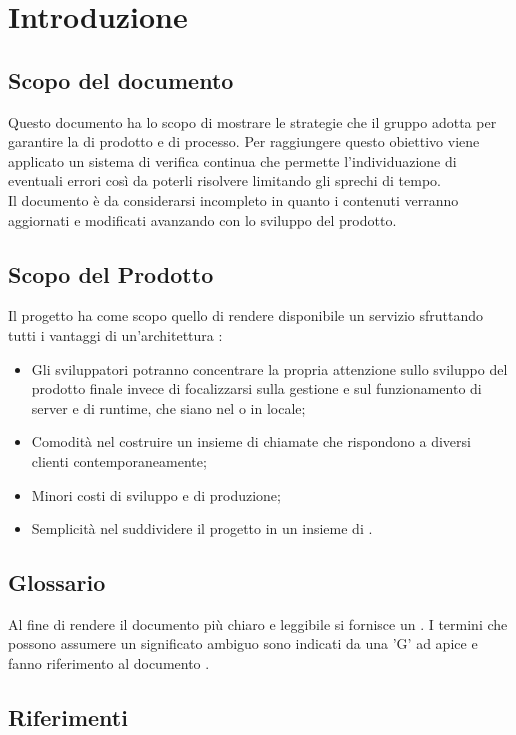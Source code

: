 \section{Introduzione}
\label{introduzione}
\subsection{Scopo del documento}
Questo documento ha lo scopo di mostrare le strategie che il gruppo {\Gruppo} adotta per garantire la  di prodotto e di processo. Per raggiungere questo obiettivo viene applicato un sistema di verifica continua che permette l'individuazione di eventuali errori così da poterli risolvere limitando gli sprechi di tempo.\\Il documento è da considerarsi incompleto in quanto i contenuti verranno aggiornati e modificati avanzando con lo sviluppo del prodotto.
\subsection{Scopo del Prodotto} 
Il progetto {\NomeProgetto} ha come scopo quello di rendere disponibile un servizio  sfruttando tutti i vantaggi di un'architettura :
\begin{itemize}
	\item Gli sviluppatori potranno concentrare la propria attenzione sullo sviluppo del prodotto finale invece di focalizzarsi sulla gestione e sul funzionamento di server e di runtime, che siano nel  o in locale;
	\item Comodità nel costruire un insieme di chiamate  che rispondono a diversi clienti contemporaneamente;
	\item Minori costi di sviluppo e di produzione;
	\item Semplicità nel suddividere il progetto in un insieme di .
\end{itemize}
\subsection{Glossario}
Al fine di rendere il documento più chiaro e leggibile si fornisce un \Glossario. I termini che possono assumere un significato ambiguo sono indicati da una 'G' ad apice e fanno riferimento al documento .
\subsection{Riferimenti}
